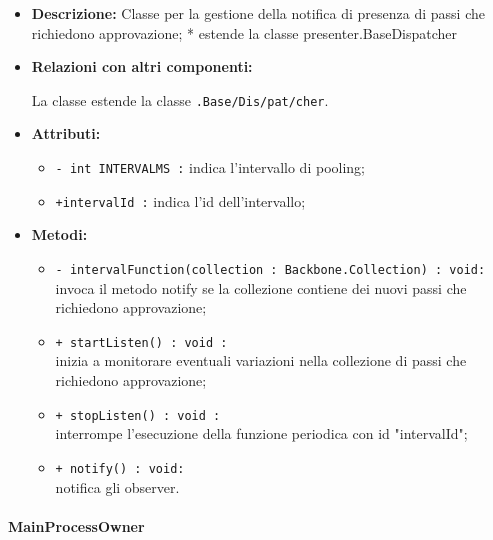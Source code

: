 \begin{flushleft}
\begin{itemize}
\item \textbf{Descrizione:} Classe per la gestione della notifica di presenza di passi che richiedono approvazione;
*         estende la classe presenter.BaseDispatcher
\item \textbf{Relazioni con altri componenti:}
\begin{sloppypar}
La classe estende la classe \texttt{\logic{}.Base\fshyp{}Dis\fshyp{}pat\fshyp{}cher}.
\end{sloppypar}
\item \textbf{Attributi:}
\begin{sloppypar}
\begin{itemize}
	\item \texttt{- int INTERVALMS :} indica l'intervallo di pooling;
  	\item \texttt{+intervalId :} indica l'id dell'intervallo;
\end{itemize}
\end{sloppypar}
\item \textbf{Metodi:}
\begin{sloppypar}
\begin{itemize}  
	\item \texttt{- intervalFunction(collection : Backbone.Collection) : void:}\\ invoca il metodo notify se la collezione contiene dei nuovi passi che richiedono approvazione;
  	\item \texttt{+ startListen() : void :}\\ inizia a monitorare eventuali variazioni nella collezione di passi che richiedono approvazione;
  	\item \texttt{+ stopListen() : void :}\\ interrompe l'esecuzione della funzione periodica con id "intervalId";
  	\item \texttt{+ notify() : void:}\\ notifica gli observer.
\end{itemize}
\end{sloppypar}
\end{itemize}
\end{flushleft}

\paragraph{MainProcessOwner}
\label{mainProcessOwner}


